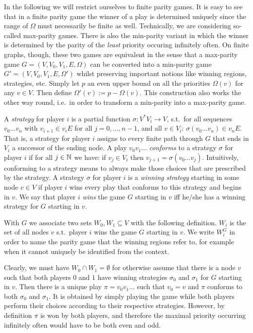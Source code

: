 In the following we will restrict ourselves to finite parity games. It is easy to see that in a finite
parity game the winner of a play is determined uniquely since the range of $\Omega$ must necessarily
be finite as well. Technically, we are considering so-called max-parity games. There is also the
min-parity variant in which the winner is determined by the parity of the \emph{least} priority occuring
infinitely often. On finite graphs, though, these two games are equivalent in the sense that a max-parity
game $G = (V,V_0,V_1,E,\Omega)$ can be converted into a min-parity game $G' = (V,V_0,V_1,E,\Omega')$
whilst preserving important notions like winning regions, strategies, etc. Simply let $p$ an even upper
bound on all the priorities $\Omega(v)$ for any $v \in V$. Then define $\Omega'(v) := p - \Omega(v)$.
This construction also works the other way round, i.e.\ in order to transform a min-parity into a
max-parity game.

A \emph{strategy} for player $i$ is a partial function $\sigma: V^*V_i \to V$, s.t.\ for all sequences
$v_0 \ldots v_n$ with $v_{i+1} \in v_iE$ for all $j=0,\ldots,n-1$, and all $v \in V_i$:
$\sigma(v_0\ldots v_n) \in v_nE$. That is, a strategy for player $i$ assigns to every finite path through
$G$ that ends in $V_i$ a successor of the ending node. A play $v_0 v_1 \ldots$ \emph{conforms} to a strategy
$\sigma$ for player $i$ if for all $j \in \mathbb{N}$ we have: if $v_j \in V_i$ then 
$v_{j+1} = \sigma(v_0\ldots v_j)$.
Intuitively, conforming to a strategy means to always make those choices that are prescribed by the strategy.
A strategy $\sigma$ for player $i$ is a \emph{winning strategy} starting in some node $v \in V$ if player $i$ wins
every play that conforms to this strategy and begins in $v$. We say that player $i$ \emph{wins} the game $G$
starting in $v$ iff he/she has a winning strategy for $G$ starting in $v$.

With $G$ we associate two sets $W_0,W_1 \subseteq V$ with the following definition. $W_i$ is the set of
all nodes $v$ s.t.\ player $i$ wins the game $G$ starting in $v$. We write $W_i^G$ in order to name the parity 
game that the winning regions refer to, for example when it cannot uniquely be identified from the context. 

Clearly, we must have
$W_0 \cap W_1 = \emptyset$ for otherwise assume that there is a node $v$ such that both players $0$ and $1$
have winning strategies $\sigma_0$ and $\sigma_1$ for $G$ starting in $v$. Then there is a unique play
$\pi = v_0 v_1 \ldots$ such that $v_0 = v$ and $\pi$ conforms to both $\sigma_0$ and $\sigma_1$. It is
obtained by simply playing the game while both players perform their choices according to their respective
strategies. However, by definition $\pi$ is won by both players, and therefore the maximal priority occurring
infinitely often would have to be both even and odd.


